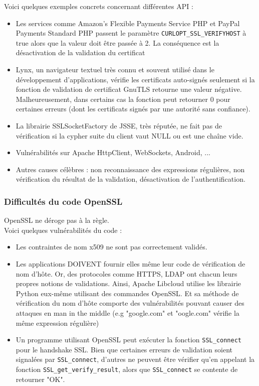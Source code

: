 Voici quelques exemples concrets concernant différentes API :
\begin{itemize}
\item Les services comme Amazon's Flexible Payments Service PHP et PayPal Payments Standard PHP passent le paramètre \texttt{CURLOPT\_SSL\_VERIFYHOST} à true alors que la valeur doit être passée à 2. La conséquence est la désactivation de la validation du certificat
\item Lynx, un navigateur textuel très connu et souvent utilisé dans le développement d'applications, vérifie les certificats auto-signés seulement si la fonction de validation de certificat GnuTLS retourne une valeur négative. Malheureusement, dans certains cas la fonction peut retourner 0 pour certaines erreurs (dont les certificats signés par une autorité sans confiance).
\item La librairie SSLSocketFactory de JSSE, très réputée, ne fait pas de vérification si la cypher suite du client vaut NULL ou est une chaîne vide.
\item Vulnérabilités sur Apache HttpClient, WebSockets, Android, ...
\item Autres causes célèbres : non reconnaissance des expressions régulières, non vérification du résultat de la validation, désactivation de l'authentification.\\
\end{itemize}


\subsubsection{Difficultés du code OpenSSL}


OpenSSL ne déroge pas à la règle.\\
Voici quelques vulnérabilités du code :
\begin{itemize}
\item Les contraintes de nom x509 ne sont pas correctement validés.
\item Les applications DOIVENT fournir elles même leur code de vérification de nom d'hôte. Or, des protocoles comme HTTPS, LDAP ont chacun leurs propres notions de validations. Ainsi, Apache Libcloud utilise les librairie Python eux-même utilisant des commandes OpenSSL. Et sa méthode de vérification du nom d'hôte comporte des vulnérabilités pouvant causer des attaques en man in the middle (e.g "google.com" et "oogle.com" vérifie la même expression régulière)
\item Un programme utilisant OpenSSL peut exécuter la fonction \texttt{SSL\_connect} pour le handshake SSL. Bien que certaines erreurs de validation soient signalées par \texttt{SSL\_connect}, d'autres ne peuvent être vérifier qu'en appelant la fonction \texttt{SSL\_get\_verify\_result}, alors que \texttt{SSL\_connect} se contente de retourner "OK".
\end{itemize}

